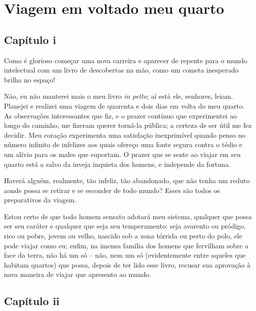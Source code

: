 \chapter[Viagem em volta do meu quarto]{Viagem em volta\break do meu quarto}  


\section{Capítulo i}

Como é glorioso começar uma nova carreira e aparecer de repente para o
mundo intelectual com um livro de descobertas na mão, como um cometa
inesperado brilha no espaço!

Não, eu não manterei mais o meu livro \textit{in petto}; aí está ele,
senhores, leiam. Planejei e realizei uma viagem de quarenta e dois dias
em volta do meu quarto. As observações interessantes que fiz, e o
prazer contínuo que experimentei ao longo do caminho, me fizeram querer
torná-la pública; a certeza de ser útil me fez decidir. Meu coração
experimenta uma satisfação inexprimível quando penso no número infinito
de infelizes aos quais ofereço uma fonte segura contra o tédio e um
alívio para os males que suportam. O prazer que se sente ao viajar em
seu quarto está a salvo da inveja inquieta dos homens, e independe da fortuna.

Haverá alguém, realmente, tão infeliz, tão abandonado, que não tenha um
reduto aonde possa se retirar e se esconder de todo mundo? Esses são
todos os preparativos da \mbox{viagem.}

Estou certo de que todo homem sensato adotará meu sistema, qualquer que
possa ser seu caráter e qualquer que seja seu temperamento: seja
avarento ou pródigo, rico ou pobre, jovem ou velho, nascido sob a zona
tórrida ou perto do polo, ele pode viajar como eu; enfim, na imensa
família dos homens que fervilham sobre a face da terra, não há um só
-- não, nem um só (evidentemente entre aqueles que habitam quartos)
que possa, depois de ter lido esse livro, recusar sua aprovação à nova
maneira de viajar que apresento ao mundo.

\section{Capítulo ii}

